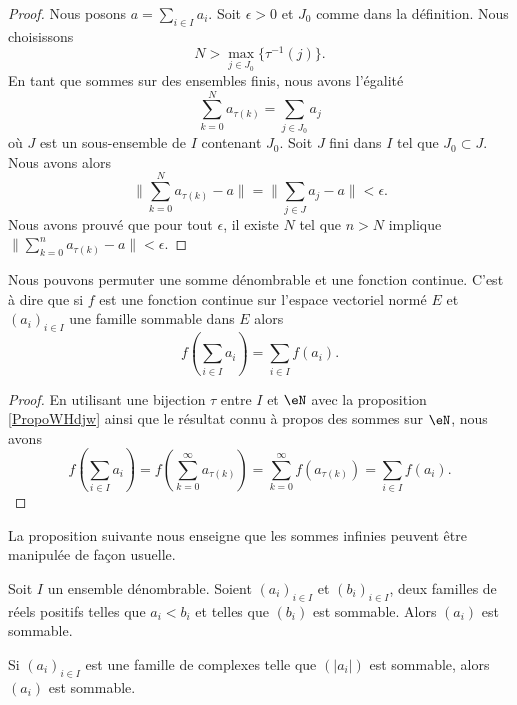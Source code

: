 \begin{proof}
    Nous posons \( a=\sum_{i\in I}a_i\). Soit \( \epsilon>0\) et \( J_0\) comme dans la définition. Nous choisissons
    \begin{equation}
        N>\max_{j\in J_0}\{ \tau^{-1}(j) \}.
    \end{equation}
    En tant que sommes sur des ensembles finis, nous avons l'égalité
    \begin{equation}
        \sum_{k=0}^Na_{\tau(k)}=\sum_{j\in J_0}a_j
    \end{equation}
    où \( J\) est un sous-ensemble de \( I\) contenant \( J_0\). Soit \( J\) fini dans \( I\) tel que \( J_0\subset J\). Nous avons alors
    \begin{equation}
        \| \sum_{k=0}^Na_{\tau(k)}-a \|=\| \sum_{j\in J}a_j-a \|<\epsilon.
    \end{equation}
    Nous avons prouvé que pour tout \( \epsilon\), il existe \( N\) tel que \( n>N\) implique \( \| \sum_{k=0}^na_{\tau(k)}-a\| <\epsilon\).
\end{proof}

\begin{corollary}
    Nous pouvons permuter une somme dénombrable et une fonction continue. C'est à dire que si \( f\) est une fonction continue sur l'espace vectoriel normé \( E\) et \( (a_i)_{i\in I}\) une famille sommable dans \( E\) alors
    \begin{equation}
        f\left( \sum_{i\in I}a_i \right)=\sum_{i\in I}f(a_i).
    \end{equation}
\end{corollary}

\begin{proof}
    En utilisant une bijection \( \tau\) entre \( I\) et \( \eN\) avec la proposition \ref{PropoWHdjw} ainsi que le résultat connu à propos des sommes sur \( \eN\), nous avons
    \begin{equation}
        f\left( \sum_{i\in I}a_i \right)=f\left( \sum_{k=0}^{\infty}a_{\tau(k)} \right)=\sum_{k=0}^{\infty}f(a_{\tau(k)})=\sum_{i\in I}f(a_i).
    \end{equation}
\end{proof}

La proposition suivante nous enseigne que les sommes infinies peuvent être manipulée de façon usuelle.
\begin{proposition} \label{PropMpBStL}
    Soit \( I\) un ensemble dénombrable. Soient \( (a_i)_{i\in I}\) et \( (b_i)_{i\in I}\), deux familles de réels positifs telles que \( a_i<b_i\) et telles que \( (b_i)\) est sommable. Alors \( (a_i)\) est sommable.

    Si \( (a_i)_{i\in I}\) est une famille de complexes telle que \( (| a_i |)\) est sommable, alors \( (a_i)\) est sommable.
\end{proposition}

